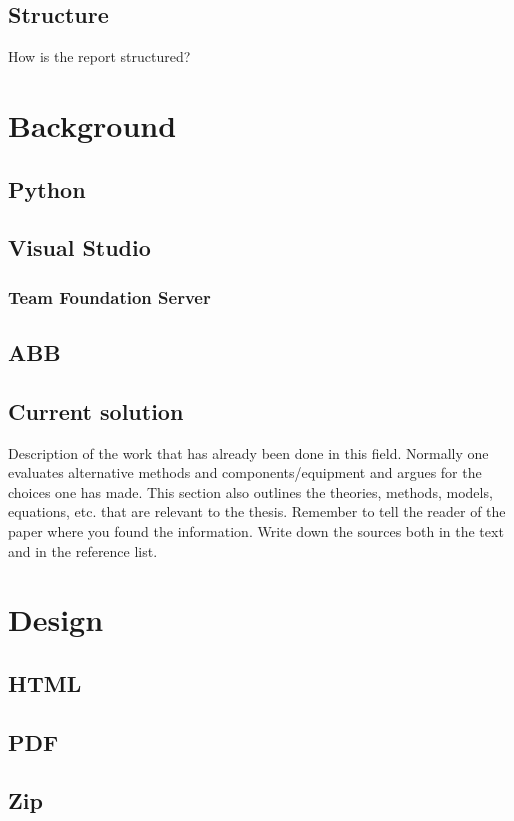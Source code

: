 \documentclass{article}
\begin{document}
	\subsection{Structure}
	How is the report structured?	
	\fi	
	\pagebreak
	
	\section{Background} \label{background}
	\subsection{Python}
	\subsection{Visual Studio}
	\subsubsection{Team Foundation Server}
	\subsection{ABB}
	\subsection{Current solution}
	
	Description of the work that has already been done in this field. Normally one
	evaluates alternative methods and components/equipment and argues for the choices one has
	made. This section also outlines the theories, methods, models, equations, etc. that are
	relevant to the thesis. Remember to tell the reader of the paper where you found the
	information. Write down the sources both in the text and in the reference list. 
	\pagebreak
	
	\section{Design} \label{design}
	
	\subsection{HTML}
	\subsection{PDF}
	\subsection{Zip}
	
\end{document}
